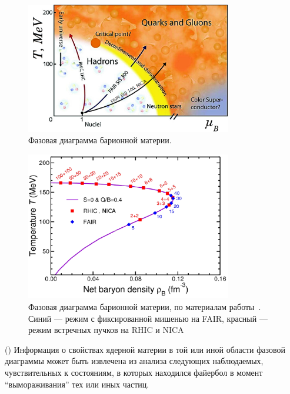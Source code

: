 \begin{figure}[H]
\includegraphics[width=0.8\textwidth]{pictures/qcdPhaseDiagram2.png}
\caption{Фазовая диаграмма барионной материи.}
\label{fig:PhaseDiagram}
\end{figure}

\begin{figure}[H]
\includegraphics[width=0.8\textwidth]{pictures/Phase_diag.png}
\caption{Фазовая диаграмма барионной материи, по материалам работы~\cite{}. Синий --- режим с фиксированной мишенью на FAIR, красный --- режим встречных пучков на RHIC и NICA}
\label{fig:PhaseDiagram2}
\end{figure}

()
Информация о свойствах ядерной материи в той или иной области фазовой диаграммы может быть извлечена из анализа следующих наблюдаемых, чувствительных к состояниям, в которых находился файербол в момент ``вымораживания'' тех или иных частиц.

